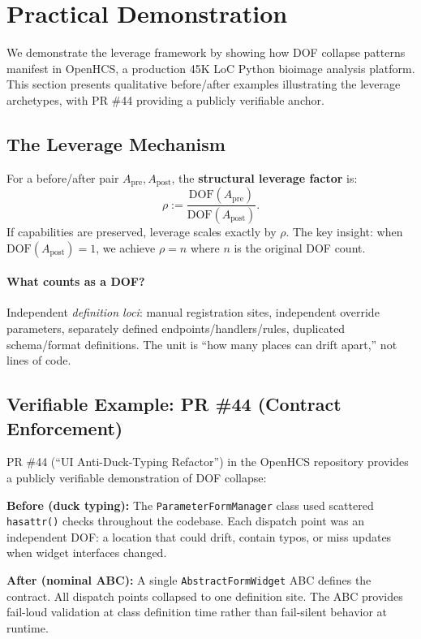 \section{Practical Demonstration}\label{practical-demonstration}

We demonstrate the leverage framework by showing how DOF collapse patterns
manifest in OpenHCS, a production 45K LoC Python bioimage analysis platform.
This section presents qualitative before/after examples illustrating the
leverage archetypes, with PR \#44 providing a publicly verifiable anchor.

\subsection{The Leverage Mechanism}

For a before/after pair $A_{\text{pre}}, A_{\text{post}}$, the
\textbf{structural leverage factor} is:
\[
\rho := \frac{\mathrm{DOF}(A_{\text{pre}})}{\mathrm{DOF}(A_{\text{post}})}.
\]
If capabilities are preserved, leverage scales exactly by $\rho$.
The key insight: when $\mathrm{DOF}(A_{\text{post}}) = 1$, we achieve
$\rho = n$ where $n$ is the original DOF count.

\paragraph{What counts as a DOF?} Independent \emph{definition loci}:
manual registration sites, independent override parameters, separately
defined endpoints/handlers/rules, duplicated schema/format definitions.
The unit is ``how many places can drift apart,'' not lines of code.

\subsection{Verifiable Example: PR \#44 (Contract Enforcement)}

PR \#44 (``UI Anti-Duck-Typing Refactor'') in the OpenHCS repository
provides a publicly verifiable demonstration of DOF collapse:

\textbf{Before (duck typing):} The \texttt{ParameterFormManager} class
used scattered \texttt{hasattr()} checks throughout the codebase.
Each dispatch point was an independent DOF: a location that could
drift, contain typos, or miss updates when widget interfaces changed.

\textbf{After (nominal ABC):} A single \texttt{AbstractFormWidget} ABC
defines the contract. All dispatch points collapsed to one definition
site. The ABC provides fail-loud validation at class definition time
rather than fail-silent behavior at runtime.

